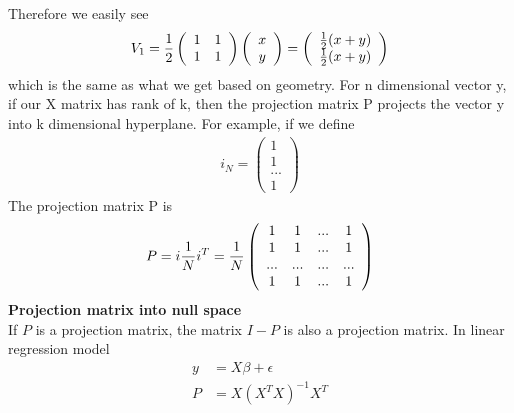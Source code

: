 \documentclass[a4paper]{article}
\begin{document}
Therefore we easily see
\begin{align*}
V_1 =  \frac{1}{2}\left( \begin{array} { c  c } 
                   1 & 1  \\
                   1 & 1  \\
           \end{array} \right) 
             \left( \begin{array} {c }
              x \\
              y \\
            \end{array} \right)
          = \left( \begin{array} {c }
              \frac{1}{2} (x+y) \\
              \frac{1}{2} (x+y) \\
            \end{array} \right)
\end{align*}
which is the same as what we get based on geometry.
 For n dimensional vector y, if our X matrix has rank of k, then the projection matrix P projects the vector y into k dimensional hyperplane. For example, if we define
\begin{align*}
i_N =   \left( \begin{array} {c }
              1 \\
              1 \\
             ...\\
              1
            \end{array} \right)
\end{align*}
The projection matrix P is
\begin{align*}
P = i \frac{1}{N}i^T
  = \frac{1}{N} \left( \begin{array} { c  c c c } 
                   1 & 1 & ... & 1 \\
                   1 & 1 & ... & 1 \\
                   ... & ... & ... & ... \\
                   1 & 1 & ... & 1 \\
           \end{array} \right) 
\end{align*}
{\bf Projection matrix into null space}\\
If $P$ is a projection matrix, the matrix $I - P$ is also a projection matrix. In linear regression model
\begin{align*}
y &= X\beta +\epsilon\\
P &= X(X^TX)^{-1}X^T\\
\end{align*}
\end{document}
